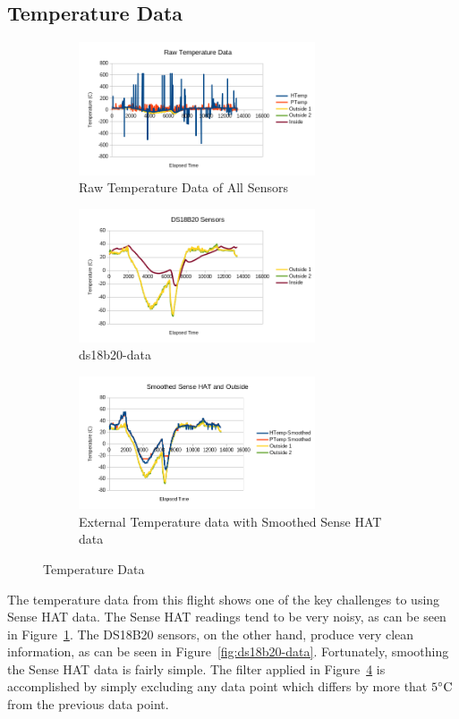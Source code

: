 \documentclass[journal]{new-aiaa}
\begin{document}
\subsection{Temperature Data}
\begin{figure}
    \centering
    \begin{subfigure}{0.45\textwidth}
        \includegraphics[width=2.75in]{images/rawtemp}
        \caption{Raw Temperature Data of All Sensors}
        \label{fig:rawtemp}
    \end{subfigure}
    \begin{subfigure}{0.45\textwidth}
        \includegraphics[width=2.75in]{images/ds18b20-data}
        \caption{ds18b20-data}
        \label{fig:ds18b20-temp}
    \end{subfigure}
    \begin{subfigure}{0.45\textwidth}
        \includegraphics[width=2.75in]{images/smoothtemp}
        \caption{External Temperature data with Smoothed Sense HAT data}
        \label{fig:smooth}
    \end{subfigure}
    \caption{Temperature Data}
\end{figure}

The temperature data from this flight shows one of the key challenges
to using Sense HAT data.  The Sense HAT readings tend to be very
noisy, as can be seen in Figure~\ref{fig:rawtemp}.  The DS18B20
sensors, on the other hand, produce very clean information, as can be
seen in Figure~\ref{fig:ds18b20-data}.  Fortunately, smoothing the
Sense HAT data is fairly simple.  The filter applied in
Figure~\ref{fig:smooth} is accomplished by simply excluding any data
point which differs by more that $5\celsius$ from the previous data
point.  
\end{document}
